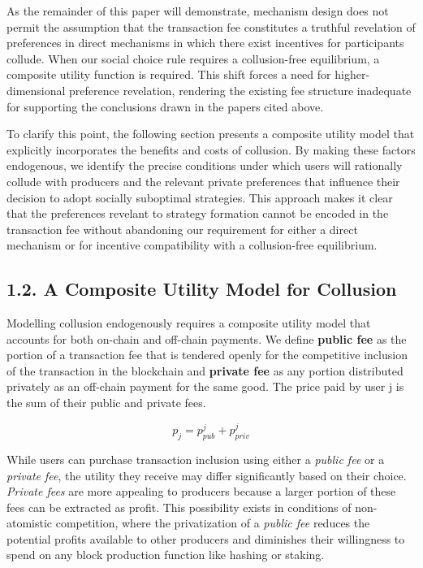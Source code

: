 \documentclass[oneside]{article}   	%
\begin{document}
As the remainder of this paper will demonstrate, mechanism design does not permit the assumption that the transaction fee constitutes a truthful revelation of preferences in direct mechanisms in which there exist incentives for participants collude. When our social choice rule requires a collusion-free equilibrium, a composite utility function is required. This shift forces a need for higher-dimensional preference revelation, rendering the existing fee structure inadequate for supporting the conclusions drawn in the papers cited above.

To clarify this point, the following section presents a composite utility model that explicitly incorporates the benefits and costs of collusion. By making these factors endogenous, we identify the precise conditions under which users will rationally collude with producers and the relevant private preferences that influence their decision to adopt socially suboptimal strategies. This approach makes it clear that the preferences revelant to strategy formation cannot be encoded in the transaction fee without abandoning our requirement for either a direct mechanism or for incentive compatibility with a collusion-free equilibrium. 

\subsection*{1.2. A Composite Utility Model for Collusion}
\vspace{0.5em}

Modelling collusion endogenously requires a composite utility model that accounts for both on-chain and off-chain payments. We define \textbf{public fee} as the portion of a transaction fee that is tendered openly for the competitive inclusion of the transaction in the blockchain and \textbf{private fee} as any portion distributed privately as an off-chain payment for the same good. The price paid by user j is the sum of their public and private fees.

$$
p_j = p_{pub}^j + p_{priv}^j
$$

While users can purchase transaction inclusion using either a \textit{public fee} or a \textit{private fee}, the utility they receive may differ significantly based on their choice. \textit{Private fees} are more appealing to producers because a larger portion of these fees can be extracted as profit. This possibility exists in conditions of non-atomistic competition, where the privatization of a \textit{public fee} reduces the potential profits available to other producers and diminishes their willingness to spend on any block production function like hashing or staking.
\end{document}
